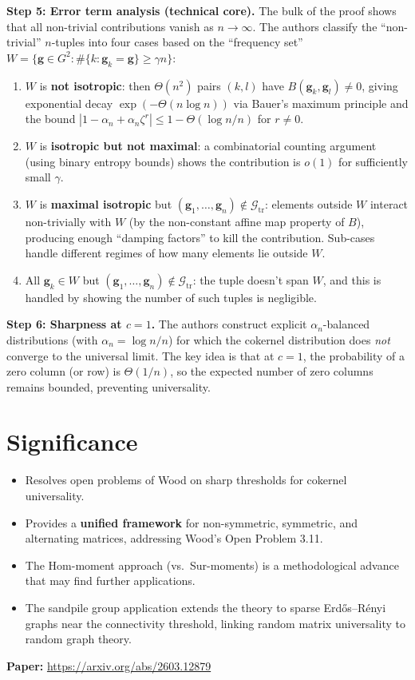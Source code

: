 \documentclass[11pt,a4paper]{article}
\begin{document}
\medskip
\noindent\textbf{Step 5: Error term analysis (technical core).}
The bulk of the proof shows that all non-trivial contributions vanish as $n\to\infty$. The authors classify the ``non-trivial'' $n$-tuples into four cases based on the ``frequency set'' $W = \{\mathbf{g} \in G^2 : \#\{k : \mathbf{g}_k = \mathbf{g}\} \ge \gamma n\}$:
\begin{enumerate}
    \item[(C1)] $W$ is \textbf{not isotropic}: then $\Theta(n^2)$ pairs $(k,l)$ have $B(\mathbf{g}_k,\mathbf{g}_l)\neq 0$, giving exponential decay $\exp(-\Theta(n\log n))$ via Bauer's maximum principle and the bound $|1-\alpha_n + \alpha_n \zeta^r| \le 1 - \Theta(\log n / n)$ for $r\neq 0$.
    \item[(C2)] $W$ is \textbf{isotropic but not maximal}: a combinatorial counting argument (using binary entropy bounds) shows the contribution is $o(1)$ for sufficiently small $\gamma$.
    \item[(C3a--C3c)] $W$ is \textbf{maximal isotropic} but $(\mathbf{g}_1,\ldots,\mathbf{g}_n) \notin \mathcal{G}_{\mathrm{tr}}$: elements outside $W$ interact non-trivially with $W$ (by the non-constant affine map property of $B$), producing enough ``damping factors'' to kill the contribution. Sub-cases handle different regimes of how many elements lie outside $W$.
    \item[(C3d)] All $\mathbf{g}_k \in W$ but $(\mathbf{g}_1,\ldots,\mathbf{g}_n)\notin \mathcal{G}_{\mathrm{tr}}$: the tuple doesn't span $W$, and this is handled by showing the number of such tuples is negligible.
\end{enumerate}

\medskip
\noindent\textbf{Step 6: Sharpness at $c=1$.}
The authors construct explicit $\alpha_n$-balanced distributions (with $\alpha_n = \log n / n$) for which the cokernel distribution does \emph{not} converge to the universal limit. The key idea is that at $c=1$, the probability of a zero column (or row) is $\Theta(1/n)$, so the expected number of zero columns remains bounded, preventing universality.

\section{Significance}

\begin{itemize}
    \item Resolves open problems of Wood on sharp thresholds for cokernel universality.
    \item Provides a \textbf{unified framework} for non-symmetric, symmetric, and alternating matrices, addressing Wood's Open Problem 3.11.
    \item The Hom-moment approach (vs.\ Sur-moments) is a methodological advance that may find further applications.
    \item The sandpile group application extends the theory to sparse Erd\H{o}s--R\'enyi graphs near the connectivity threshold, linking random matrix universality to random graph theory.
\end{itemize}

\medskip
\noindent\textbf{Paper:} \url{https://arxiv.org/abs/2603.12879}
\end{document}
